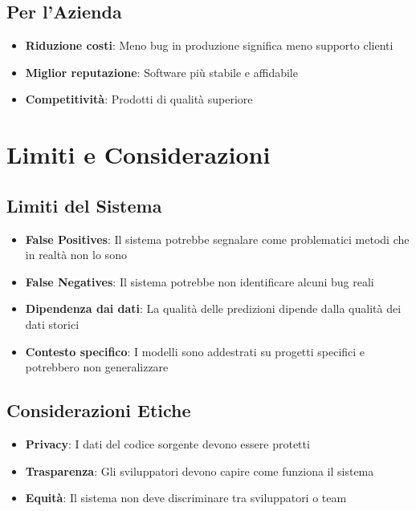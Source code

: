 \documentclass[12pt,a4paper]{article}
\begin{document}
\subsection{Per l'Azienda}

\begin{itemize}
    \item \textbf{Riduzione costi}: Meno bug in produzione significa meno supporto clienti
    \item \textbf{Miglior reputazione}: Software più stabile e affidabile
    \item \textbf{Competitività}: Prodotti di qualità superiore
\end{itemize}

\section{Limiti e Considerazioni}

\subsection{Limiti del Sistema}

\begin{itemize}
    \item \textbf{False Positives}: Il sistema potrebbe segnalare come problematici metodi che in realtà non lo sono
    \item \textbf{False Negatives}: Il sistema potrebbe non identificare alcuni bug reali
    \item \textbf{Dipendenza dai dati}: La qualità delle predizioni dipende dalla qualità dei dati storici
    \item \textbf{Contesto specifico}: I modelli sono addestrati su progetti specifici e potrebbero non generalizzare
\end{itemize}

\subsection{Considerazioni Etiche}

\begin{itemize}
    \item \textbf{Privacy}: I dati del codice sorgente devono essere protetti
    \item \textbf{Trasparenza}: Gli sviluppatori devono capire come funziona il sistema
    \item \textbf{Equità}: Il sistema non deve discriminare tra sviluppatori o team
\end{itemize}
\end{document}
